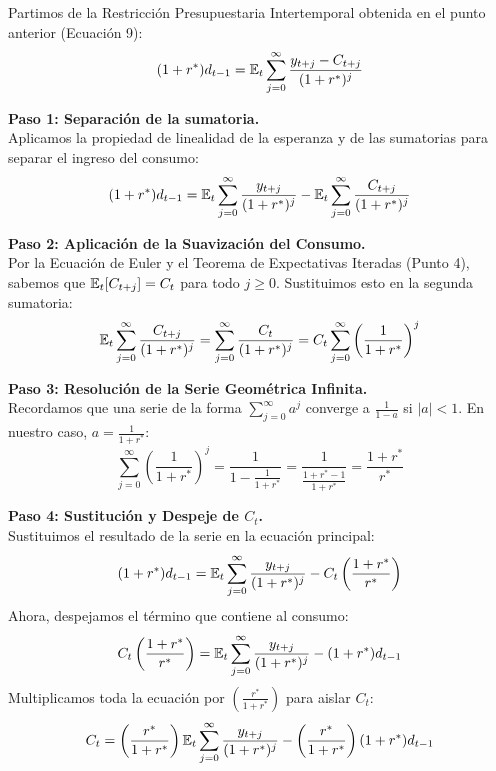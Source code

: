 Partimos de la Restricción Presupuestaria Intertemporal obtenida en el punto anterior (Ecuación 9):
\begin{equation}
    (1+r^*)d_{t-1} = \mathbb{E}_t \sum_{j=0}^{\infty} \frac{y_{t+j} - C_{t+j}}{(1+r^*)^j}
\end{equation}

\textbf{Paso 1: Separación de la sumatoria.} \\
Aplicamos la propiedad de linealidad de la esperanza y de las sumatorias para separar el ingreso del consumo:
\begin{equation}
    (1+r^*)d_{t-1} = \mathbb{E}_t \sum_{j=0}^{\infty} \frac{y_{t+j}}{(1+r^*)^j} - \mathbb{E}_t \sum_{j=0}^{\infty} \frac{C_{t+j}}{(1+r^*)^j}
\end{equation}

\textbf{Paso 2: Aplicación de la Suavización del Consumo.} \\
Por la Ecuación de Euler y el Teorema de Expectativas Iteradas (Punto 4), sabemos que $\mathbb{E}_t[C_{t+j}] = C_t$ para todo $j \geq 0$. Sustituimos esto en la segunda sumatoria:
\begin{equation}
    \mathbb{E}_t \sum_{j=0}^{\infty} \frac{C_{t+j}}{(1+r^*)^j} = \sum_{j=0}^{\infty} \frac{C_t}{(1+r^*)^j} = C_t \sum_{j=0}^{\infty} \left( \frac{1}{1+r^*} \right)^j
\end{equation}

\textbf{Paso 3: Resolución de la Serie Geométrica Infinita.} \\
Recordamos que una serie de la forma $\sum_{j=0}^{\infty} a^j$ converge a $\frac{1}{1-a}$ si $|a| < 1$. En nuestro caso, $a = \frac{1}{1+r^*}$:
\begin{equation}
    \sum_{j=0}^{\infty} \left( \frac{1}{1+r^*} \right)^j = \frac{1}{1 - \frac{1}{1+r^*}} = \frac{1}{\frac{1+r^*-1}{1+r^*}} = \frac{1+r^*}{r^*}
\end{equation}

\textbf{Paso 4: Sustitución y Despeje de $C_t$.} \\
Sustituimos el resultado de la serie en la ecuación principal:
\begin{equation}
    (1+r^*)d_{t-1} = \mathbb{E}_t \sum_{j=0}^{\infty} \frac{y_{t+j}}{(1+r^*)^j} - C_t \left( \frac{1+r^*}{r^*} \right)
\end{equation}
Ahora, despejamos el término que contiene al consumo:
\begin{equation}
    C_t \left( \frac{1+r^*}{r^*} \right) = \mathbb{E}_t \sum_{j=0}^{\infty} \frac{y_{t+j}}{(1+r^*)^j} - (1+r^*)d_{t-1}
\end{equation}
Multiplicamos toda la ecuación por $\left( \frac{r^*}{1+r^*} \right)$ para aislar $C_t$:
\begin{equation}
    C_t = \left( \frac{r^*}{1+r^*} \right) \mathbb{E}_t \sum_{j=0}^{\infty} \frac{y_{t+j}}{(1+r^*)^j} - \left( \frac{r^*}{1+r^*} \right) (1+r^*)d_{t-1}
\end{equation}

